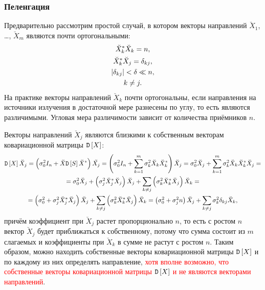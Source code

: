 \subsubsection{Пеленгация}

Предварительно рассмотрим простой случай, в котором векторы направлений $\breve{X}_1$, \dots, $\breve{X}_m$ являются почти ортогональными:
\begin{gather*}
    \breve{X}_k^* \breve{X}_k = n, \\
    \breve{X}_k^* \breve{X}_j = \delta_{kj}, \\
    \left | \delta_{kj} \right | < \delta \ll n, \\
    k \neq j .
\end{gather*}
На практике векторы направлений $\breve{X}_k$ почти ортогональны, если направления на источники излучения в достаточной мере разнесены по углу, то есть являются
различимыми. Угловая мера различимости зависит от количества приёмников $n$.

Векторы направлений $\breve{X}_j$ являются близкими к собственным векторам ковариационной матрицы $\mathtt{D} \left [ X \right ]$:
\begin{multline*}
    \mathtt{D} \left [ X \right ] \breve{X}_j
    = \left ( \sigma_0^2 I_n + \breve{X} \mathtt{D} \left [ S \right ] \breve{X}^* \right ) \breve{X_j}
    = \left ( \sigma_0^2 I_n + \sum_{k=1}^m \sigma_k^2 \breve{X}_k \breve{X}_k^* \right ) \breve{X}_j
    = \sigma_0^2 \breve{X}_j + \sum_{k=1}^m \sigma_k^2 \breve{X}_k \breve{X}_k^* \breve{X}_j = \\
    = \sigma_0^2 \breve{X}_j + \left ( \sigma_j^2 \breve{X}_j^* \breve{X}_j \right ) \breve{X}_j + \sum_{k \neq j} \left ( \sigma_k^2 \breve{X}_k^* \breve{X}_j \right ) \breve{X}_k = \\
    = \left ( \sigma_0^2 + \sigma_j^2 \breve{X}_j^* \breve{X}_j \right ) \breve{X}_j + \sum_{k \neq j} \left ( \sigma_k^2 \breve{X}_k^* \breve{X}_j \right ) \breve{X}_k
    = \left ( \sigma_0^2 + \sigma_j^2 n \right ) \breve{X}_j + \sum_{k \neq j} \sigma_k^2 \delta_{kj} \breve{X}_k ,
\end{multline*}
причём коэффициент при $\breve{X}_j$ растет пропорционально $n$, то есть с ростом $n$ вектор $\breve{X}_j$ будет приближаться к собственному, потому что сумма состоит из $m$
слагаемых и коэффициенты при $\breve{X}_k$ в сумме не растут с ростом $n$. Таким образом, можно находить собственные векторы ковариационной матрицы $\mathtt{D} \left [ X \right ]$ и по каждому
из них определять направление, \textcolor{red}{хотя вполне возможно, что собственные векторы ковариационной матрицы $\mathtt{D} \left [ X \right ]$ и не являются векторами направлений}.

